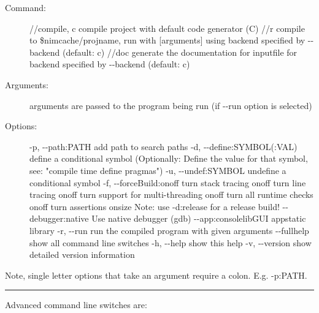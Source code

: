 \begin{description}
\item[Command:]
//compile, c compile project with default code generator (C) //r compile
to \$nimcache/projname, run with {[}arguments{]} using backend specified
by {-\/-backend} (default: c) //doc generate the documentation for
inputfile for backend specified by {-\/-backend} (default: c)
\item[Arguments:]
arguments are passed to the program being run (if -\/-run option is
selected)
\item[Options:]
-p, -\/-path:PATH add path to search paths -d, -\/-define:SYMBOL(:VAL)
define a conditional symbol (Optionally: Define the value for that
symbol, see: "compile time define pragmas") -u, -\/-undef:SYMBOL
undefine a conditional symbol -f, -\/-forceBuild:onoff turn stack
tracing onoff turn line tracing onoff turn support for multi-threading
onoff turn all runtime checks onoff turn assertions onsize Note: use
-d:release for a release build! -\/-debugger:native Use native debugger
(gdb) -\/-app:consolelibGUI appstatic library -r, -\/-run run the
compiled program with given arguments -\/-fullhelp show all command line
switches -h, -\/-help show this help -v, -\/-version show detailed
version information
\end{description}

Note, single letter options that take an argument require a colon. E.g.
-p:PATH.

\begin{center}\rule{0.5\linewidth}{0.5pt}\end{center}

Advanced command line switches are:

